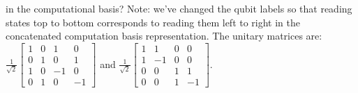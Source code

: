 in the computational basis?
\Soln Note: we've changed the qubit labels so that reading states top to bottom corresponds to reading them left to right in the concatenated computation basis representation.   The unitary matrices are: $\frac{1}{\sqrt{2}}\begin{bmatrix} 1 & 0 & 1 & 0 \\ 0 & 1 & 0 & 1 \\ 1 & 0 & -1 & 0 \\ 0 & 1 & 0 & -1\end{bmatrix}$ and $\frac{1}{\sqrt{2}}\begin{bmatrix} 1 & 1 & 0 & 0 \\ 1 & -1 & 0 & 0 \\ 0 & 0 & 1 & 1 \\ 0 & 0 & 1 & -1\end{bmatrix}$.


